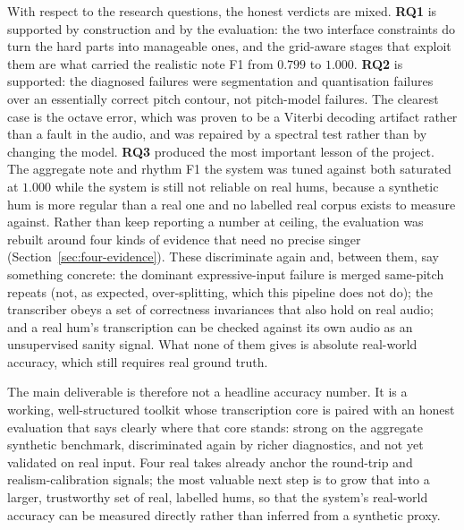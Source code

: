 \documentclass[12pt,a4paper]{article}
\begin{document}
With respect to the research questions, the honest verdicts are mixed.
\textbf{RQ1} is supported by construction and by the evaluation: the two
interface constraints do turn the hard parts into manageable ones, and the
grid-aware stages that exploit them are what carried the realistic note F1 from
$0.799$ to $1.000$. \textbf{RQ2} is supported: the diagnosed failures were
segmentation and quantisation failures over an essentially correct pitch
contour, not pitch-model failures. The clearest case is the octave error, which
was proven to be a Viterbi decoding artifact rather than a fault in the audio,
and was repaired by a spectral test rather than by changing the model.
\textbf{RQ3} produced the most important lesson of the project. The aggregate
note and rhythm F1 the system was tuned against both saturated at $1.000$ while
the system is still not reliable on real hums, because a synthetic hum is more
regular than a real one and no labelled real corpus exists to measure against.
Rather than keep reporting a number at ceiling, the evaluation was rebuilt around
four kinds of evidence that need no precise singer
(Section~\ref{sec:four-evidence}). These discriminate again and, between them,
say something concrete: the dominant expressive-input failure is merged
same-pitch repeats (not, as expected, over-splitting, which this pipeline does
not do); the transcriber obeys a set of correctness invariances that also hold on
real audio; and a real hum's transcription can be checked against its own audio
as an unsupervised sanity signal. What none of them gives is absolute real-world
accuracy, which still requires real ground truth.

The main deliverable is therefore not a headline accuracy number. It is a
working, well-structured toolkit whose transcription core is paired with an
honest evaluation that says clearly where that core stands: strong on the
aggregate synthetic benchmark, discriminated again by richer diagnostics, and not
yet validated on real input. Four real takes already anchor the round-trip and
realism-calibration signals; the most valuable next step is to grow that into a
larger, trustworthy set of real, labelled hums, so that the system's real-world
accuracy can be measured directly rather than inferred from a synthetic proxy.
\end{document}
